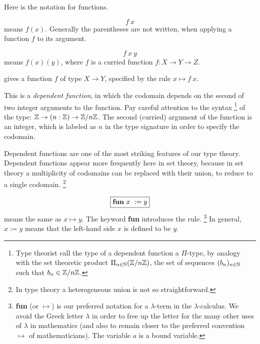 \documentclass[12pt]{article}
\numberwithin{definition}{section}
\begin{document}
Here is the notation for functions.


\[
\boxed{f\ x}
\]
means $f(x)$.  Generally the parentheses are not written, when
applying a function $f$ to its argument.

\[
\boxed{f\ x\ y}
\]
means $f(x)(y)$, where $f$ is a curried function $f:X\to Y\to Z$.


\begin{center}
\end{center}
gives a function $f$ of type $X\to Y$, specified by the rule $x\mapsto f\ x$.

\begin{center}
\end{center}
This is a \emph{dependent function}, in which the codomain depends on
the second of two integer arguments to the function.  Pay careful
attention to the syntax%
\footnote{Type theorist call the type of a dependent function a
  $\Pi$-type, by analogy with the set theoretic product $\Pi_{n\in{\mathbb N}}
  ({\mathbb Z}/n{\mathbb Z})$, the set of sequences $(b_n)_{n\in{\mathbb N}}$ such that
  $b_n\in {\mathbb Z}/n{\mathbb Z}$.}
%
of the type: ${\mathbb Z}\to (n:{\mathbb Z}) \to
{\mathbb Z}/n{\mathbb Z}$. The second (curried) argument of the function is an
integer, which is labeled as $n$ in the type signature in order to
specify the codomain.

Dependent functions are one of the most striking features of our type
theory.  Dependent functions appear more frequently here in set
theory, because in set theory a multiplicity of codomains can be
replaced with their union, to reduce to a single codomain.%
\footnote{In type theory a heterogeneous union is not so
  straightforward.}

\[
\boxed{\text{\bf fun}\ x\ := y}
\]
means the same as $x\mapsto y$.  The keyword {\bf fun} introduces the
rule.%
\footnote{{\bf fun} (or $\mapsto$) is our preferred notation for a
  $\lambda$-term in the $\lambda$-calculus.  We avoid the Greek letter
  $\lambda$ in order to free up the letter for the many other uses of
  $\lambda$ in mathematics (and also to remain closer to the preferred
  convention $\mapsto$ of mathematicians).  The variable $a$ is a
  bound variable.}  In general, $x := y$ means that the left-hand side
$x$ is defined to be $y$.
\end{document}
